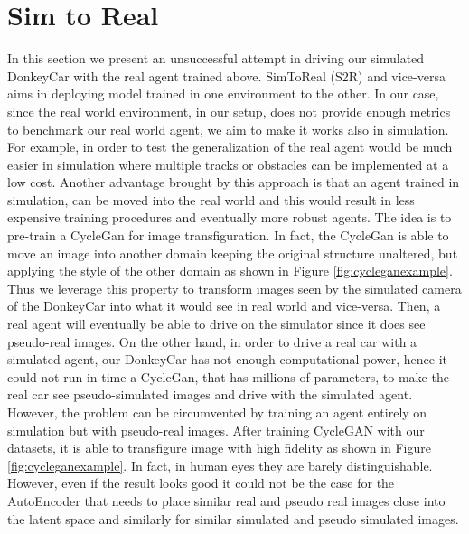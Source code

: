 \section{Sim to Real}

In this section we present an unsuccessful attempt in driving our simulated DonkeyCar with the real agent trained above. SimToReal (S2R) and vice-versa aims in deploying model trained in one environment to the other. In our case, since the real world environment, in our setup, does not provide enough metrics to benchmark our real world agent, we aim to make it works also in simulation. For example, in order to test the generalization of the real agent would be much easier in simulation where multiple tracks or obstacles can be implemented at a low cost. Another advantage brought by this approach is that an agent trained in simulation, can be moved into the real world and this would result in less expensive training procedures and eventually more robust agents. The idea is to pre-train a CycleGan \citep{CycleGAN2017} for image transfiguration. In fact, the CycleGan is able to move an image into another domain keeping the original structure unaltered, but applying the style of the other domain as shown in Figure \ref{fig:cycleganexample}. Thus we leverage this property to transform images seen by the simulated camera of the DonkeyCar into what it would see in real world and vice-versa. Then, a real agent will eventually be able to drive on the simulator since it does see pseudo-real images. On the other hand, in order to drive a real car with a simulated agent, our DonkeyCar has not enough computational power, hence it could not run in time a CycleGan, that has millions of parameters, to make the real car see pseudo-simulated images and drive with the simulated agent. However, the problem can be circumvented by training an agent entirely on simulation but with pseudo-real images. After training CycleGAN with our datasets, it is able to transfigure image with high fidelity as shown in Figure \ref{fig:cycleganexample}. In fact, in human eyes they are barely distinguishable. However, even if the result looks good it could not be the case for the AutoEncoder that needs to place similar real and pseudo real images close into the latent space and similarly for similar simulated and pseudo simulated images.

